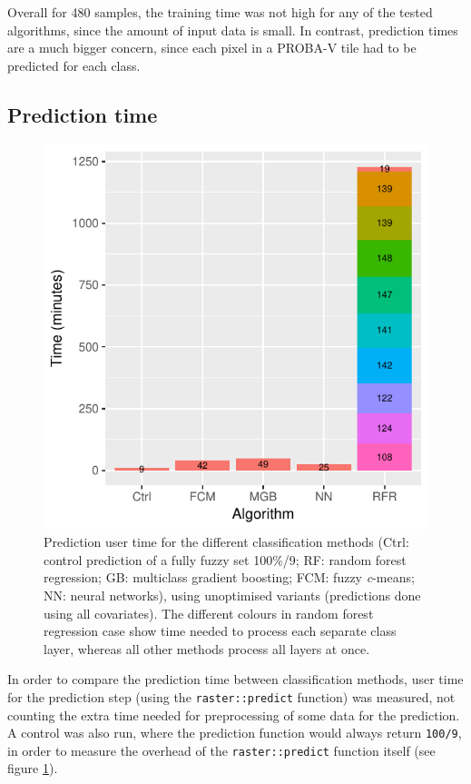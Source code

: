 \documentclass[a4paper,10pt]{book}
\begin{document}
Overall for 480 samples, the training time was not high for any of the tested algorithms, since the amount of input data is small. In contrast, prediction times are a much bigger concern, since each pixel in a PROBA-V tile had to be predicted for each class.

\subsection{Prediction time}

\begin{figure}
  \centering
  \includegraphics[width=\textwidth]{../plot/timing}
  \caption{Prediction user time for the different classification methods (Ctrl: control prediction of a fully fuzzy set 100\%/9; RF: random forest regression; GB: multiclass gradient boosting; FCM: fuzzy \textit{c}-means; NN: neural networks), using unoptimised variants (predictions done using all covariates). The different colours in random forest regression case show time needed to process each separate class layer, whereas all other methods process all layers at once.}
  \label{fig-timing}
\end{figure}

In order to compare the prediction time between classification methods, user time for the prediction step (using the \texttt{raster::predict} function) was measured, not counting the extra time needed for preprocessing of some data for the prediction. A control was also run, where the prediction function would always return \texttt{100/9}, in order to measure the overhead of the \texttt{raster::predict} function itself (see figure \ref{fig-timing}).
\end{document}
